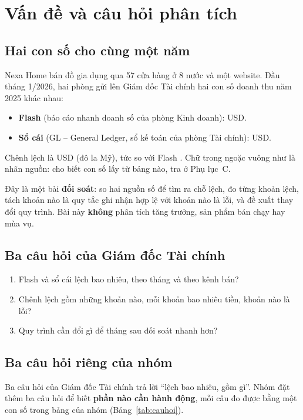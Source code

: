 \section{Vấn đề và câu hỏi phân tích}

\subsection{Hai con số cho cùng một năm}

Nexa Home bán đồ gia dụng qua 57 cửa hàng ở 8 nước và một website. Đầu tháng 1/2026, hai phòng gửi lên Giám đốc Tài chính hai con số doanh thu năm 2025 khác nhau:
\begin{itemize}
  \item \textbf{Flash} (báo cáo nhanh doanh số của phòng Kinh doanh): \SoFlashNam{} USD.
  \item \textbf{Sổ cái} (GL -- General Ledger, sổ kế toán của phòng Tài chính): \SoSoCaiNam{} USD.
\end{itemize}
Chênh lệch là \SoChenhLechNam{} USD (đô la Mỹ), tức \SoPctNam{} so với Flash . Chữ trong ngoặc vuông như  là nhãn nguồn: cho biết con số lấy từ bảng nào, tra ở Phụ lục~C.

Đây là một bài \textbf{đối soát}: so hai nguồn số để tìm ra chỗ lệch, đo từng khoản lệch, tách khoản nào là quy tắc ghi nhận hợp lệ với khoản nào là lỗi, và đề xuất thay đổi quy trình. Bài này \textbf{không} phân tích tăng trưởng, sản phẩm bán chạy hay mùa vụ.

\subsection{Ba câu hỏi của Giám đốc Tài chính}

\begin{enumerate}
  \item Flash và sổ cái lệch bao nhiêu, theo tháng và theo kênh bán?
  \item Chênh lệch gồm những khoản nào, mỗi khoản bao nhiêu tiền, khoản nào là lỗi?
  \item Quy trình cần đổi gì để tháng sau đối soát nhanh hơn?
\end{enumerate}

\subsection{Ba câu hỏi riêng của nhóm}

Ba câu hỏi của Giám đốc Tài chính trả lời ``lệch bao nhiêu, gồm gì''. Nhóm đặt thêm ba câu hỏi để biết \textbf{phần nào cần hành động}, mỗi câu đo được bằng một con số trong bảng của nhóm (Bảng~\ref{tab:cauhoi}).

